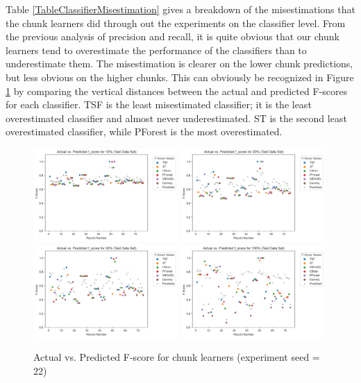 Table \ref{TableClassifierMisestimation} gives a breakdown of the misestimations that the chunk learners did through out the experiments on the classifier level.
From the previous analysis of precision and recall, it is quite obvious that our chunk learners tend to overestimate the performance of the classifiers than to underestimate them.
The misestimation is clearer on the lower chunk predictions, but less obvious on the higher chunks.
This can obviously be recognized in Figure \ref{Img:ActualvsPredScatter} by comparing the vertical distances between the actual and predicted F-scores for each classifier.
TSF is the least misestimated classifier; it is the least overestimated classifier and almost never underestimated.
ST is the second least overestimated classifier, while PForest is the most overestimated.

\begin{figure}[hbt!]
    \captionsetup{justification=raggedright}
    \includegraphics[width=0.49\textwidth,keepaspectratio]{scatter_test_actual_vs_pred_10pct.png}
    \includegraphics[width=0.49\textwidth,keepaspectratio]{scatter_test_actual_vs_pred_20pct.png}
    \\[\smallskipamount]
    \includegraphics[width=0.49\textwidth,keepaspectratio]{scatter_test_actual_vs_pred_30pct.png}
    \includegraphics[width=0.49\textwidth,keepaspectratio]{scatter_test_actual_vs_pred_100pct.png}
    \caption{Actual vs. Predicted F-score for chunk learners (experiment seed = 22)}
    \label{Img:ActualvsPredScatter}
\end{figure}

